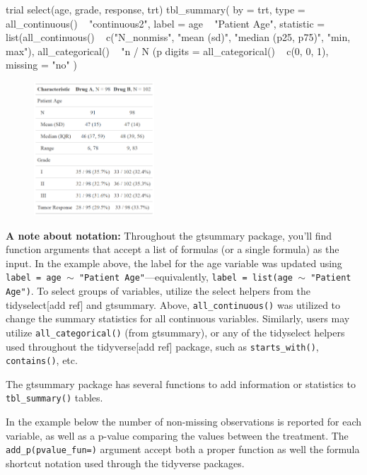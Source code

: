 \begin{example}
trial %
  select(age, grade, response, trt) %
  tbl_summary(
    by = trt,
    type = all_continuous() ~ "continuous2",
    label = age ~ "Patient Age",
    statistic = list(all_continuous() ~ c("{N_nonmiss}", 
                                          "{mean} ({sd})", 
                                          "{median} ({p25}, {p75})", 
                                          "{min}, {max}"),
                     all_categorical() ~ "{n} / {N} ({p}%
    digits = all_categorical() ~ c(0, 0, 1),
    missing = "no"
  )
\end{example}
\begin{figure}[h!]
  \includegraphics[height=5cm]{summary_plus.png}
  \centering
\end{figure}

\textbf{A note about notation:}
Throughout the gtsummary package, you'll find function arguments that accept a list of formulas (or a single formula) as the input.
In the example above, the label for the age variable was updated using \texttt{label = age $\sim$ "Patient Age"}---equivalently, \texttt{label = list(age $\sim$ "Patient Age")}.
To select groups of variables, utilize the select helpers from the tidyselect[add ref] and gtsummary.
Above, \texttt{all\_continuous()} was utilized to change the summary statistics for all continuous variables. 
Similarly, users may utilize \texttt{all\_categorical()} (from gtsummary), or any of the tidyselect helpers used throughout the tidyverse[add ref] package, such as \texttt{starts\_with()}, \texttt{contains()}, etc.

The gtsummary package has several functions to add information or statistics to \texttt{tbl\_summary()} tables.



In the example below the number of non-missing observations is reported for each variable, as well as a p-value comparing the values between the treatment.
The \texttt{add\_p(pvalue\_fun=)} argument accept both a proper function as well the formula shortcut notation used through the tidyverse packages.

